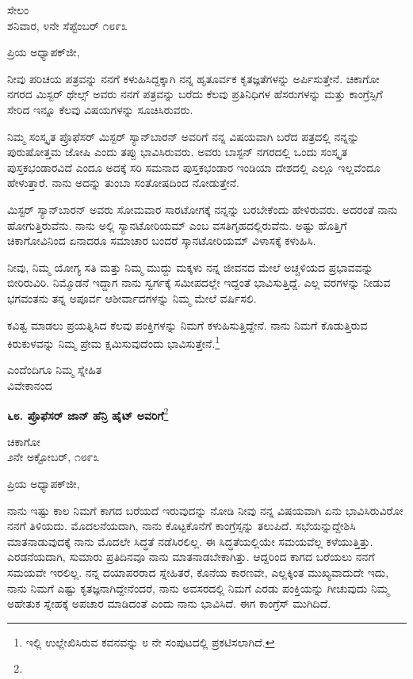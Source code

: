 \begin{flushright}
ಸೇಲಂ\\ಶನಿವಾರ, ೪ನೇ ಸೆಪ್ಟೆಂಬರ್ ೧೮೯೩
\end{flushright}

\noindent
ಪ್ರಿಯ ಅಧ್ಯಾಪಕ್‌ಜೀ,

ನೀವು ಪರಿಚಯ ಪತ್ರವನ್ನು ನನಗೆ ಕಳುಹಿಸಿದ್ದಕ್ಕಾಗಿ ನನ್ನ ಹೃತೂರ್ವಕ ಕೃತಜ್ಞತೆಗಳನ್ನು ಅರ್ಪಿಸುತ್ತೇನೆ. ಚಿಕಾಗೋ ನಗರದ ಮಿಸ್ಟರ್‌ ಥೇಲ್ಸ್ ಅವರು ನನಗೆ ಪತ್ರವನ್ನು ಬರೆದು ಕೆಲವು ಪ್ರತಿನಿಧಿಗಳ ಹೆಸರುಗಳನ್ನು ಮತ್ತು ಕಾಂಗ್ರೆಸ್ಸಿಗೆ ಸೇರಿದ ಇನ್ನೂ ಕೆಲವು ವಿಷಯಗಳನ್ನು ಸೂಚಿಸಿರುವರು.

ನಿಮ್ಮ ಸಂಸ್ಕೃತ ಪ್ರೊಫೆಸರ್ ಮಿಸ್ಟರ್ ಸ್ಯಾನ್‌ಬಾರನ್ ಅವರಿಗೆ ನನ್ನ ವಿಷಯವಾಗಿ ಬರೆದ ಪತ್ರದಲ್ಲಿ ನನ್ನನ್ನು ಪುರುಷೋತ್ತಮ ಜೋಷಿ ಎಂದು ತಪ್ಪು ಭಾವಿಸಿರುವರು. ಅವರು ಬಾಸ್ಟನ್ ನಗರದಲ್ಲಿ ಒಂದು ಸಂಸ್ಕೃತ ಪುಸ್ತಕಭಂಡಾರವಿದೆ ಎಂದೂ ಅದಕ್ಕೆ ಸರಿ ಸಮನಾದ ಪುಸ್ತಕಭಂಡಾರ ಇಂಡಿಯಾ ದೇಶದಲ್ಲಿ ಎಲ್ಲೂ ಇಲ್ಲವೆಂದೂ ಹೇಳುತ್ತಾರೆ. ನಾನು ಅದನ್ನು ತುಂಬಾ ಸಂತೋಷದಿಂದ ನೋಡುತ್ತೇನೆ.

ಮಿಸ್ಟರ್ ಸ್ಯಾನ್‌ಬಾರನ್ ಅವರು ಸೋಮವಾರ ಸಾರಟೋಗಕ್ಕೆ ನನ್ನನ್ನು ಬರಬೇಕೆಂದು ಹೇಳಿರುವರು. ಅದರಂತೆ ನಾನು ಹೋಗುತ್ತಿರುವೆನು. ನಾನು ಅಲ್ಲಿ ಸ್ಯಾನಟೋರಿಯಮ್ ಎಂಬ ವಸತಿಗೃಹದಲ್ಲಿರುವೆನು. ಅಷ್ಟು ಹೊತ್ತಿಗೆ ಚಿಕಾಗೋವಿನಿಂದ ಏನಾದರೂ ಸಮಾಚಾರ ಬಂದರೆ ಸ್ಕಾನಟೋರಿಯಮ್ ವಿಳಾಸಕ್ಕೆ ಕಳುಹಿಸಿ.

ನೀವು, ನಿಮ್ಮ ಯೋಗ್ಯ ಸತಿ ಮತ್ತು ನಿಮ್ಮ ಮುದ್ದು ಮಕ್ಕಳು ನನ್ನ ಜೀವನದ ಮೇಲೆ ಅಚ್ಚಳಿಯದ ಪ್ರಭಾವವನ್ನು ಬೀರಿರುವಿರಿ. ನಿಮ್ಮೊಡನೆ ಇದ್ದಾಗ ನಾನು ಸ್ವರ್ಗಕ್ಕೆ ಸಮೀಪದಲ್ಲೇ ಇದ್ದಂತೆ ಭಾವಿಸುತ್ತಿದ್ದೆ. ಎಲ್ಲ ವರಗಳನ್ನು ನೀಡುವ ಭಗವಂತನು ತನ್ನ ಅಪೂರ್ವ ಆಶೀರ್ವಾದಗಳನ್ನು ನಿಮ್ಮ ಮೇಲೆ ವರ್ಷಿಸಲಿ.

ಕವಿತ್ವ ಮಾಡಲು ಪ್ರಯತ್ನಿಸಿದ ಕೆಲವು ಪಂಕ್ತಿಗಳನ್ನು ನಿಮಗೆ ಕಳುಹಿಸುತ್ತಿದ್ದೇನೆ. ನಾನು ನಿಮಗೆ ಕೊಡುತ್ತಿರುವ ಕಿರುಕುಳವನ್ನು ನಿಮ್ಮ ಪ್ರೇಮ ಕ್ಷಮಿಸುವುದೆಂದು ಭಾವಿಸುತ್ತೇನೆ.\footnote{ಇಲ್ಲಿ ಉಲ್ಲೇಖಿಸಿರುವ ಕವನವನ್ನು ೮ ನೇ ಸಂಪುಟದಲ್ಲಿ ಪ್ರಕಟಿಸಲಾಗಿದೆ.}

{\flushright
ಎಂದೆಂದಿಗೂ ನಿಮ್ಮ ಸ್ನೇಹಿತ\\ವಿವೇಕಾನಂದ\par}

\eject

\begin{center}
\textbf{೬೮. ಪ್ರೊಫೆಸರ್ ಜಾನ್ ಹೆನ್ರಿ ಹೈಟ್ ಅವರಿಗೆ}\footnote{}
\end{center}
\vspace{-0.5cm}

\begin{flushright}
ಚಿಕಾಗೋ\\೨ನೇ ಅಕ್ಟೋಬರ್, ೧೮೯೩
\end{flushright}
\vspace{-0.5cm}

\noindent
ಪ್ರಿಯ ಅಧ್ಯಾಪಕ್‌ಜೀ,

ನಾನು ಇಷ್ಟು ಕಾಲ ನಿಮಗೆ ಕಾಗದ ಬರೆಯದೆ ಇರುವುದನ್ನು ನೋಡಿ ನೀವು ನನ್ನ ವಿಷಯವಾಗಿ ಏನು ಭಾವಿಸಿರುವಿರೋ ನನಗೆ ತಿಳಿಯದು. ಮೊದಲನೆಯದಾಗಿ, ನಾನು ಕೊಟ್ಟಕೊನೆಗೆ ಕಾಂಗ್ರೆಸ್ಸನ್ನು ತಲುಪಿದೆ. ಸಭೆಯನ್ನುದ್ದೇಶಿಸಿ ಮಾತನಾಡುವುದಕ್ಕೆ ನಾನು ಮೊದಲೇ ಸಿದ್ಧತೆ ನಡೆಸಿರಲಿಲ್ಲ. ಈ ಸಿದ್ಧತೆಯಲ್ಲಿಯೇ ಸಮಯವೆಲ್ಲ ಕಳೆಯುತ್ತಿತ್ತು. ಎರಡನೆಯದಾಗಿ, ಸುಮಾರು ಪ್ರತಿದಿನವೂ ನಾನು ಮಾತನಾಡಬೇಕಾಗಿತ್ತು. ಆದ್ದರಿಂದ ಕಾಗದ ಬರೆಯಲು ನನಗೆ ಸಮಯವೇ ಇರಲಿಲ್ಲ. ನನ್ನ ದಯಾಪರರಾದ ಸ್ನೇಹಿತರೆ, ಕೊನೆಯ ಕಾರಣವೇ, ಎಲ್ಲಕ್ಕಿಂತ ಮುಖ್ಯವಾದುದೇ ಇದು, ನಾನು ನಿಮಗೆ ಎಷ್ಟು ಕೃತಜ್ಞನಾಗಿದ್ದೇನೆಂದರೆ, ನಾನು ಅವಸರದಲ್ಲಿ ನಿಮಗೆ ಎರಡು ಪಂಕ್ತಿಯನ್ನು ಗೀಚುವುದು ನಿಮ್ಮ ಅಹೇತುಕ ಸ್ನೇಹಕ್ಕೆ ಅಪಚಾರ ಮಾಡಿದಂತೆ ಎಂದು ನಾನು ಭಾವಿಸಿದೆ. ಈಗ ಕಾಂಗ್ರೆಸ್ ಮುಗಿದಿದೆ.

